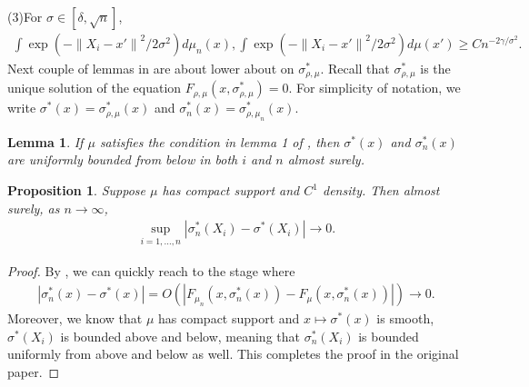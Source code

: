 \documentclass[10pt]{article}
\newcommand{\norm}[1]{\left\lVert#1\right\rVert}
\newtheorem{lemma}{\bf Lemma}
\newtheorem{proposition}{\bf Proposition}
\newenvironment{Proof of lemma}{\noindent{\bf Proof of Lemma}}{\hfill$\Box$\newline}
\newenvironment{Proof of claim}{\noindent{\bf Proof of claim}}{\hfill$\Box$\newline}
\newenvironment{Proof of theorem}{\noindent{\bf Proof of Theorem}}{\hfill\scriptsize{$\Box$}\newline}
\newenvironment{Proof of theorems}{\noindent{\bf Proof of Theorems}}{\hfill$\Box$\newline}
\newenvironment{Proof of proposition}{\noindent{\bf Proof of Proposition}}{\hfill$\Box$\newline}
\newenvironment{Proof of propositions}{\noindent{\bf Proof of Propositions}}{\hfill$\Box$\newline}
\newenvironment{Proof of exercise}{\noindent{\it Proof of Exercise:}}{\hfill$\Box$}
\numberwithin{equation}{section}
\begin{document}
(3)For $\sigma\in [\delta,\sqrt{n}]$,
\begin{align}
    \int \exp(-\norm{X_i-x'}^2/2\sigma^2)d\mu_n(x),\int \exp(-\norm{X_i-x'}^2/2\sigma^2)d\mu(x') \geq Cn^{-2\gamma/\sigma^2}.
\end{align}
Next couple of lemmas in \cite{auffinger-tsne} are about lower about on $\sigma^*_{\rho,\mu}$. Recall that $\sigma^*_{\rho,\mu}$ is the unique solution of the equation $F_{\rho,\mu}(x,\sigma^*_{\rho,\mu})=0$. For simplicity of notation, we write $\sigma^*(x) = \sigma^*_{\rho,\mu}(x)$ and $\sigma^*_n(x) = \sigma^*_{\rho,\mu_n}(x)$.
\begin{lemma} \label{sigma_lower_bdd_lemma}
    If $\mu$ satisfies the condition in lemma 1 of \cite{auffinger-tsne}, then $\sigma^*(x)$ and $\sigma^*_n(x)$ are uniformly bounded from below in both $i$ and $n$ almost surely.
\end{lemma}
\begin{proposition} \label{sigma_diff_prop}
    Suppose $\mu$ has compact support and $C^1$ density. Then almost surely, as $n \to \infty$,
    \begin{align}
        \sup_{i=1,\dots,n}|\sigma_n^*(X_i)-\sigma^*(X_i)| \to 0.
    \end{align}
\end{proposition}
\begin{proof}
    By \cite{auffinger-tsne}, we can quickly reach to the stage where
    \begin{align}
        |\sigma_n^*(x)-\sigma^*(x)| = O(|F_{\mu_n}(x,\sigma_n^*(x))-F_{\mu}(x,\sigma_n^*(x))|) \to 0.
    \end{align}
    Moreover, we know that $\mu$ has compact support and $x \mapsto \sigma^*(x)$ is smooth, $\sigma^*(X_i)$ is bounded above and below, meaning that  $\sigma_n^*(X_i)$ is bounded uniformly from above and below as well. This completes the proof in the original paper.
\end{proof}
\end{document}
